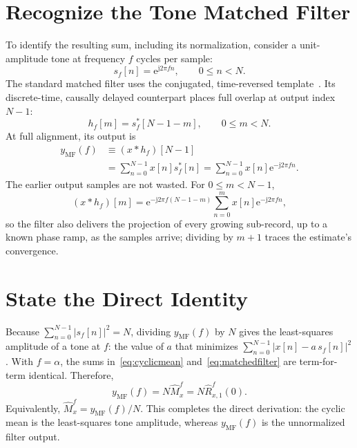 \documentclass[11pt,draftcls,onecolumn,journal]{IEEEtran}
\newcommand{\ee}{\mathrm{e}}
\newcommand{\jj}{\mathrm{j}}
\begin{document}
\section*{Recognize the Tone Matched Filter}

To identify the resulting sum, including its normalization, consider a unit-amplitude tone at frequency $f$ cycles per sample:
\begin{equation}
s_f[n]=\ee^{\jj2\pi fn},\qquad 0\leq n<N.
\label{eq:tone}
\end{equation}
The standard matched filter uses the conjugated, time-reversed template~\cite[chs. 4 and 13]{kay1998}.  Its discrete-time, causally delayed counterpart places full overlap at output index $N-1$:
\begin{equation}
h_f[m]=s_f^*[N-1-m],\qquad 0\leq m<N.
\label{eq:filter}
\end{equation}
At full alignment, its output is
\begin{equation}
\begin{aligned}
y_{\mathrm{MF}}(f)
&\equiv (x*h_f)[N-1]\\
&=\sum_{n=0}^{N-1}x[n]s_f^*[n]
=\sum_{n=0}^{N-1}x[n]\ee^{-\jj2\pi fn}.
\end{aligned}
\label{eq:matchedfilter}
\end{equation}
The earlier output samples are not wasted.  For $0\leq m<N-1$,
\begin{equation}
(x*h_f)[m]
=\ee^{-\jj2\pi f(N-1-m)}
\sum_{n=0}^{m}x[n]\ee^{-\jj2\pi fn},
\label{eq:runningoutput}
\end{equation}
so the filter also delivers the projection of every growing sub-record, up to a known phase ramp, as the samples arrive; dividing by $m+1$ traces the estimate's convergence.

\section*{State the Direct Identity}

Because $\sum_{n=0}^{N-1}|s_f[n]|^2=N$, dividing $y_{\mathrm{MF}}(f)$ by $N$ gives the least-squares amplitude of a tone at $f$: the value of $a$ that minimizes $\sum_{n=0}^{N-1}|x[n]-a\,s_f[n]|^2$.  With $f=\alpha$, the sums in~\eqref{eq:cyclicmean} and~\eqref{eq:matchedfilter} are term-for-term identical.  Therefore,
\begin{equation}
\boxed{
y_{\mathrm{MF}}(f)
=N\widehat M_x^f
=N\widehat R_{x,1}^f(0)
}.
\label{eq:directmatch}
\end{equation}
Equivalently, $\widehat M_x^f=y_{\mathrm{MF}}(f)/N$.  This completes the direct derivation: the cyclic mean is the least-squares tone amplitude, whereas $y_{\mathrm{MF}}(f)$ is the unnormalized filter output.
\end{document}
